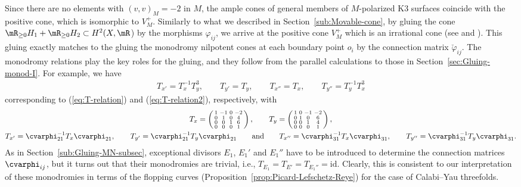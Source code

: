\documentclass[pdftex]{sigma}
\numberwithin{equation}{section}
\begin{document}
Since there are no elements with $(v,v)_{M}=-2$ in $M$, the ample cones of general members of $M$-polarized K3 surfaces coincide with the positive cone, which is isomorphic to $V_{M}^{+}$. Similarly to what we described in Section~\ref{sub:Movable-cone}, by gluing the cone $\mR_{\geq0}H_{1}+\mR_{\geq0}H_{2}\subset H^{2}(X,\mR$) by the morphisms $\varphi_{ij}$, we arrive at the positive cone $V_{M}^{+}$ which is an irrational cone (see \cite{Oguiso2} and \cite[Section~1.5]{FGvGvL}). This gluing exactly matches to the gluing the monodromy nilpotent cones at each boundary point $o_{i}$ by the connection matrix $\check{\varphi}_{ij}$. The monodromy relations play the key roles for the gluing, and they follow from the parallel calculations to those in Section~\ref{sec:Gluing-monod-I}. For example, we have
\begin{gather*}
T_{x'}=T_{x}^{-1}T_{y}^{3},\qquad T_{y'}=T_{y},\qquad T_{x''}=T_{x},\qquad T_{y''}=T_{y}^{-1}T_{x}^{3}
\end{gather*}
corresponding to (\ref{eq:T-relation}) and (\ref{eq:T-relation2}), respectively, with
\begin{gather*}
 T_{x}=\left(\begin{smallmatrix}1 & -1 & 0 & -2\\
0 & 1 & 0 & 4\\
0 & 0 & 1 & 6\\
0 & 0 & 0 & 1
\end{smallmatrix}\right),\qquad T_{y}=\left(\begin{smallmatrix}1 & 0 & -1 & -2\\
0 & 1 & 0 & 6\\
0 & 0 & 1 & 4\\
0 & 0 & 0 & 1
\end{smallmatrix}\right),\\
 T_{x'}=\cvarphi_{21}^{-1}T_{x}\cvarphi_{21},\qquad T_{y'}=\cvarphi_{21}^{-1}T_{y}\cvarphi_{21}\qquad \text{and}\qquad T_{x''}=\cvarphi_{31}^{-1}T_{x}\cvarphi_{31},\qquad T_{y''}=\cvarphi_{31}^{-1}T_{y}\cvarphi_{31}.
\end{gather*}
 As in Section~\ref{sub:Gluing-MN-subsec}, exceptional divisors $E_{1}$, $E_{1}'$ and $E_{1}''$ have to be introduced to determine the connection matrices $\cvarphi_{ij}$, but it turns out that their monodromies are trivial, i.e., $T_{E_{1}}=T_{E'}=T_{E_{1}''}=\mathrm{id}$. Clearly, this is consistent to our interpretation of these monodromies in terms of the flopping curves (Proposition~\ref{prop:Picard-Lefschetz-Reye}) for the case of Calabi--Yau threefolds.
\end{document}
